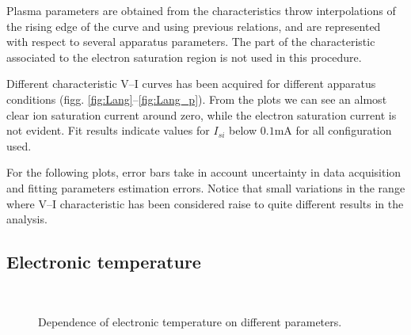 \documentclass[11pt,a4 paper]{article}
\begin{document}
Plasma parameters are obtained from the characteristics throw interpolations of the rising edge of the curve and using previous relations, and are represented with respect to several apparatus parameters. The part of the characteristic associated to the electron saturation region is not used in this procedure.

Different characteristic V--I curves has been acquired for different apparatus conditions (figg. \ref{fig:Lang}--\ref{fig:Lang_p}). From the plots we can see an almost clear ion saturation current around zero, while the electron saturation current is not evident. Fit results indicate values for $I_{si}$ below $0.1\si{\milli\ampere}$ for all configuration used.

For the following plots, error bars take in account uncertainty in data acquisition and fitting parameters estimation errors.
Notice that small variations in the  range where V--I characteristic has been considered raise to quite different results in the analysis.

\subsection{Electronic temperature}
\begin{figure}[H]
\\%
 \caption{Dependence of electronic temperature on different parameters.}\label{fig:Te}%
\end{figure}%
\end{document}

